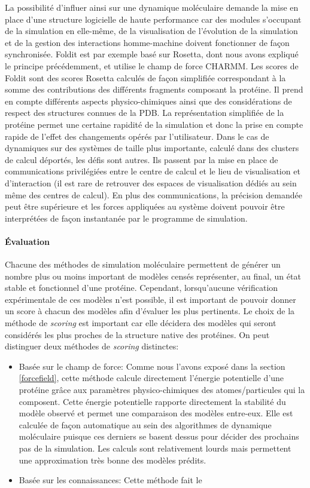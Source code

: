 La possibilité d'influer ainsi sur une dynamique moléculaire demande la mise en place d'une structure logicielle de haute performance car des modules s'occupant de la simulation en elle-même, de la visualisation de l'évolution de la simulation et de la gestion des interactions homme-machine doivent fonctionner de façon synchronisée. Foldit est par exemple basé sur Rosetta, dont nous avons expliqué le principe précédemment, et utilise le champ de force CHARMM. Les scores de Foldit sont des scores Rosetta calculés de façon simplifiée correspondant à la somme des contributions des différents fragments composant la protéine. Il prend en compte différents aspects physico-chimiques ainsi que des considérations de respect des structures connues de la PDB.
La représentation simplifiée de la protéine permet une certaine rapidité de la simulation et donc la prise en compte rapide de l'effet des changements opérés par l'utilisateur. Dans le cas de dynamiques sur des systèmes de taille plus importante, calculé dans des clusters de calcul déportés, les défis sont autres. Ils passent par la mise en place de communications privilégiées entre le centre de calcul et le lieu de visualisation et d'interaction (il est rare de retrouver des espaces de visualisation dédiés au sein même des centres de calcul). En plus des communications, la précision demandée peut être supérieure et les forces appliquées au système doivent pouvoir être interprétées de façon instantanée par le programme de simulation.

\paragraph{Évaluation}

Chacune des méthodes de simulation moléculaire permettent de générer un nombre plus ou moins important de modèles censés représenter, au final, un état stable et fonctionnel d'une protéine. Cependant, lorsqu'aucune vérification expérimentale de ces modèles n'est possible, il est important de pouvoir donner un score à chacun des modèles afin d'évaluer les plus pertinents. Le choix de la méthode de \textit{scoring} est important car elle décidera des modèles qui seront considérés les plus proches de la structure native des protéines. On peut distinguer deux méthodes de \textit{scoring} distinctes:

\begin{itemize}
	\item Basée sur le champ de force: Comme nous l'avons exposé dans la section \ref{forcefield}, cette méthode calcule directement l'énergie potentielle d'une protéine grâce aux paramètres physico-chimiques des atomes/particules qui la composent. Cette énergie potentielle rapporte directement la stabilité du modèle observé et permet une comparaison des modèles entre-eux. Elle est calculée de façon automatique au sein des algorithmes de dynamique moléculaire puisque ces derniers se basent dessus pour décider des prochains pas de la simulation. Les calculs sont relativement lourds mais permettent une approximation très bonne des modèles prédits.
	\item Basée sur les connaissances: Cette méthode fait le
\end{itemize}

